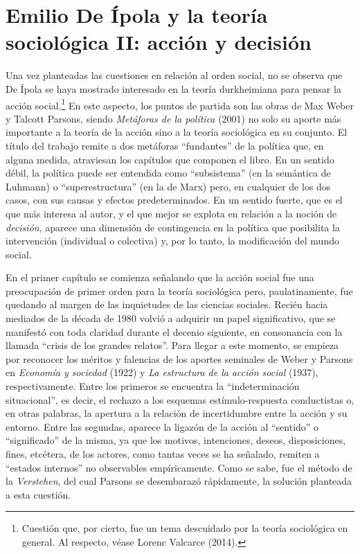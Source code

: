 \section{Emilio De Ípola y la teoría sociológica II: acción y decisión}

Una vez planteadas las cuestiones en relación al orden social, no se observa que De Ípola se haya mostrado interesado en la teoría durkheimiana para pensar la acción social.\footnote{Cuestión que, por cierto, fue un tema descuidado por la teoría sociológica en general. Al respecto, véase Lorenc Valcarce (2014).} En este aspecto, los puntos de partida son las obras de Max Weber y Talcott Parsons, siendo \emph{Metáforas de la política} (2001) no solo su aporte más importante a la teoría de la acción sino a la teoría sociológica en su conjunto. El título del trabajo remite a dos metáforas \enquote{fundantes} de la política que, en alguna medida, atraviesan los capítulos que componen el libro. En un sentido débil, la política puede ser entendida como \enquote{subsistema} (en la semántica de Luhmann) o \enquote{superestructura} (en la de Marx) pero, en cualquier de los dos casos, con sus causas y efectos predeterminados. En un sentido fuerte, que es el que más interesa al autor, y el que mejor se explota en relación a la noción de \emph{decisión}, aparece una dimensión de contingencia en la política que posibilita la intervención (individual o colectiva) y, por lo tanto, la modificación del mundo social.

En el primer capítulo se comienza señalando que la acción social fue una preocupación de primer orden para la teoría sociológica pero, paulatinamente, fue quedando al margen de las inquietudes de las ciencias sociales. Recién hacia mediados de la década de 1980 volvió a adquirir un papel significativo, que se manifestó con toda claridad durante el decenio siguiente, en consonancia con la llamada \enquote{crisis de los grandes relatos}. Para llegar a este momento, se empieza por reconocer los méritos y falencias de los aportes seminales de Weber y Parsons en \emph{Economía y sociedad} (1922) y \emph{La estructura de la acción social} (1937), respectivamente. Entre los primeros se encuentra la \enquote{indeterminación situacional}, es decir, el rechazo a los esquemas estímulo-respuesta conductistas o, en otras palabras, la apertura a la relación de incertidumbre entre la acción y su entorno. Entre las segundas, aparece la ligazón de la acción al \enquote{sentido} o \enquote{significado} de la misma, ya que los motivos, intenciones, deseos, disposiciones, fines, etcétera, de los actores, como tantas veces se ha señalado, remiten a \enquote{estados internos} no observables empíricamente. Como se sabe, fue el método de la \emph{Verstehen}, del cual Parsons se desembarazó rápidamente, la solución planteada a esta cuestión.

